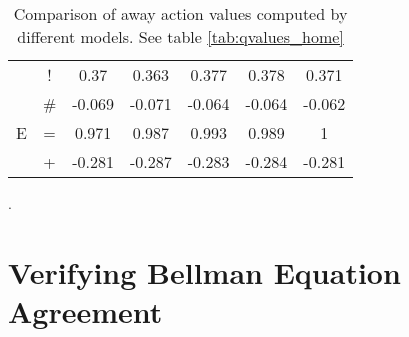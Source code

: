 \documentclass{sfuthesis}
\begin{document}
\begin{table}[]
\begin{tabular}{ccccccc}
		& \multicolumn{1}{c|}{!}                & 0.37               & 0.363                 & 0.377                & \multicolumn{1}{c|}{0.378}               & 0.371         \\
		& \multicolumn{1}{c|}{\#}               & -0.069             & -0.071                & -0.064               & \multicolumn{1}{c|}{-0.064}              & -0.062        \\ \hline
		E              & \multicolumn{1}{c|}{=}                & 0.971              & 0.987                 & 0.993                & \multicolumn{1}{c|}{0.989}               & 1             \\
		& \multicolumn{1}{c|}{+}                & -0.281             & -0.287                & -0.283               & \multicolumn{1}{c|}{-0.284}              & -0.281       
	\end{tabular}
	\caption{Comparison of away action values computed by different models. See table \ref{tab:qvalues_home}}.
	\label{tab:qvalues_away}
\end{table}

\section{Verifying Bellman Equation Agreement}
\end{document}
